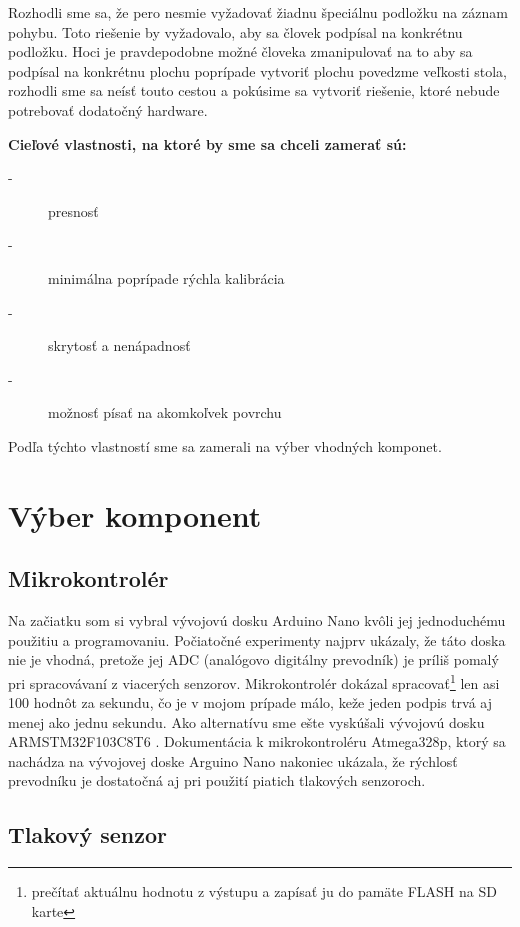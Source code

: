 Rozhodli sme sa, že pero nesmie vyžadovať žiadnu špeciálnu podložku na záznam pohybu. Toto riešenie by vyžadovalo, aby sa človek podpísal na konkrétnu podložku. Hoci je pravdepodobne možné človeka zmanipulovať na to aby sa podpísal na konkrétnu plochu poprípade vytvoriť plochu povedzme veľkosti stola, rozhodli sme sa neísť touto cestou a pokúsime sa vytvoriť riešenie, ktoré nebude potrebovať dodatočný hardware.\newline

\textbf{Cieľové vlastnosti, na ktoré by sme sa chceli zamerať sú:}
\begin{description}
	\item[-]{presnosť}
	\item[-]{minimálna poprípade rýchla kalibrácia}
	\item[-]{skrytosť a nenápadnosť}
	\item[-]{možnosť písať na akomkoľvek povrchu}
\end{description}

Podľa týchto vlastností sme sa zamerali na výber vhodných komponet.

\section{Výber komponent}

\subsection*{Mikrokontrolér}

Na začiatku som si vybral vývojovú dosku Arduino Nano kvôli jej jednoduchému použitiu a programovaniu. 
Počiatočné experimenty najprv ukázaly, že táto doska nie je vhodná, pretože jej ADC (analógovo digitálny prevodník) je príliš pomalý pri spracovávaní z viacerých senzorov. Mikrokontrolér dokázal spracovať\footnote{prečítať aktuálnu hodnotu z výstupu a zapísať ju do pamäte FLASH na SD karte} len asi 100 hodnôt za sekundu, čo je v mojom prípade málo, keže jeden podpis trvá aj menej ako jednu sekundu. Ako alternatívu sme ešte vyskúšali vývojovú dosku ARMSTM32F103C8T6 \cite{ArduinoARM}. Dokumentácia k mikrokontroléru Atmega328p, ktorý sa nachádza na vývojovej doske Arguino Nano nakoniec ukázala, že rýchlosť prevodníku je dostatočná aj pri použití piatich tlakových senzoroch. 

\subsection*{Tlakový senzor}

